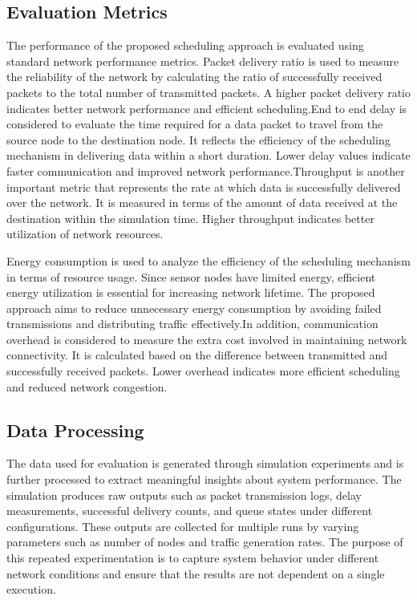 \documentclass[a4paper,fleqn]{cas-dc}
\numberwithin{equation}{section}
\begin{document}
\subsection{Evaluation Metrics}

The performance of the proposed scheduling approach is evaluated using standard network performance metrics. Packet delivery ratio is used to measure the reliability of the network by calculating the ratio of successfully received packets to the total number of transmitted packets. A higher packet delivery ratio indicates better network performance and efficient scheduling.End to end delay is considered to evaluate the time required for a data packet to travel from the source node to the destination node. It reflects the efficiency of the scheduling mechanism in delivering data within a short duration. Lower delay values indicate faster communication and improved network performance.Throughput is another important metric that represents the rate at which data is successfully delivered over the network. It is measured in terms of the amount of data received at the destination within the simulation time. Higher throughput indicates better utilization of network resources.

Energy consumption is used to analyze the efficiency of the scheduling mechanism in terms of resource usage. Since sensor nodes have limited energy, efficient energy utilization is essential for increasing network lifetime. The proposed approach aims to reduce unnecessary energy consumption by avoiding failed transmissions and distributing traffic effectively.In addition, communication overhead is considered to measure the extra cost involved in maintaining network connectivity. It is calculated based on the difference between transmitted and successfully received packets. Lower overhead indicates more efficient scheduling and reduced network congestion.

\subsection{Data Processing}
The data used for evaluation is generated through simulation experiments and is further processed to extract meaningful insights about system performance. The simulation produces raw outputs such as packet transmission logs, delay measurements, successful delivery counts, and queue states under different configurations. These outputs are collected for multiple runs by varying parameters such as number of nodes and traffic generation rates. The purpose of this repeated experimentation is to capture system behavior under different network conditions and ensure that the results are not dependent on a single execution.
\end{document}
